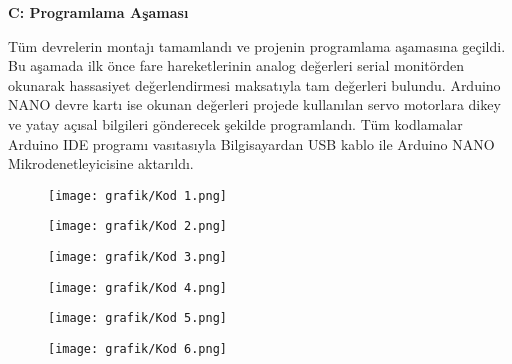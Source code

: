 \textbf{C: Programlama Aşaması }
\label{DokuzuncuBolum}

Tüm devrelerin montajı tamamlandı ve projenin programlama aşamasına geçildi. Bu aşamada ilk önce fare hareketlerinin analog değerleri serial monitörden okunarak hassasiyet değerlendirmesi maksatıyla tam değerleri bulundu. Arduino NANO devre kartı ise okunan değerleri projede kullanılan servo motorlara dikey ve yatay açısal bilgileri gönderecek şekilde programlandı. Tüm kodlamalar Arduino IDE programı vasıtasıyla Bilgisayardan USB kablo ile Arduino NANO Mikrodenetleyicisine aktarıldı.

\begin{figure}[H]
	\centering
	\texttt{[image: grafik/Kod 1.png]}
	\label{fig:KodDM}
\end{figure}
\begin{figure}[H]
	\centering
	\texttt{[image: grafik/Kod 2.png]}
	\label{fig:KodDM}
\end{figure}
\begin{figure}[H]
	\centering
	\texttt{[image: grafik/Kod 3.png]}
	\label{fig:KodDM}
\end{figure}
\begin{figure}[H]
	\centering
	\texttt{[image: grafik/Kod 4.png]}
	\label{fig:KodDM}
\end{figure}
\begin{figure}[H]
	\centering
	\texttt{[image: grafik/Kod 5.png]}
	\label{fig:KodDM}
\end{figure}
\begin{figure}[H]
	\centering
	\texttt{[image: grafik/Kod 6.png]}
	\label{fig:KodDM}
\end{figure}

\clearpage